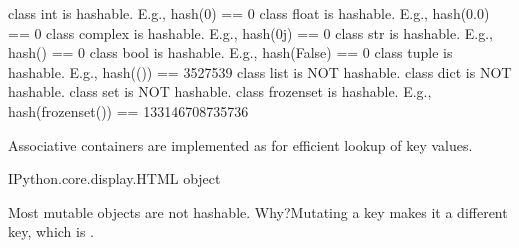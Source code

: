 \documentclass[letterpaper,10pt,english]{sphinxmanual}
\begin{document}
\begin{sphinxVerbatim}[commandchars=\\\{\}]
\PYGZlt{}class \PYGZsq{}int\PYGZsq{}\PYGZgt{} is hashable. E.g., hash(0) == 0
\PYGZlt{}class \PYGZsq{}float\PYGZsq{}\PYGZgt{} is hashable. E.g., hash(0.0) == 0
\PYGZlt{}class \PYGZsq{}complex\PYGZsq{}\PYGZgt{} is hashable. E.g., hash(0j) == 0
\PYGZlt{}class \PYGZsq{}str\PYGZsq{}\PYGZgt{} is hashable. E.g., hash(\PYGZsq{}\PYGZsq{}) == 0
\PYGZlt{}class \PYGZsq{}bool\PYGZsq{}\PYGZgt{} is hashable. E.g., hash(False) == 0
\PYGZlt{}class \PYGZsq{}tuple\PYGZsq{}\PYGZgt{} is hashable. E.g., hash(()) == 3527539
\PYGZlt{}class \PYGZsq{}list\PYGZsq{}\PYGZgt{} is NOT hashable.
\PYGZlt{}class \PYGZsq{}dict\PYGZsq{}\PYGZgt{} is NOT hashable.
\PYGZlt{}class \PYGZsq{}set\PYGZsq{}\PYGZgt{} is NOT hashable.
\PYGZlt{}class \PYGZsq{}frozenset\PYGZsq{}\PYGZgt{} is hashable. E.g., hash(frozenset()) == 133146708735736
\end{sphinxVerbatim}


Associative containers are implemented as  for efficient lookup of key values.

\begin{sphinxVerbatim}[commandchars=\\\{\}]
      
\end{sphinxVerbatim}

\begin{sphinxVerbatim}[commandchars=\\\{\}]
\PYGZlt{}IPython.core.display.HTML object\PYGZgt{}
\end{sphinxVerbatim}

Most mutable objects are not hashable. Why?Mutating a key makes it a different key, which is .
\end{document}
